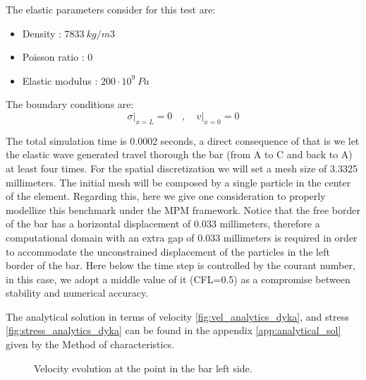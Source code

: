 The elastic parameters consider for this test are:
\begin{itemize} 
\item  Density : $7833\ kg/m3$
\item  Poisson ratio : $0$
\item  Elastic modulus : $200 \cdot 10^9\ Pa$
\end{itemize}

The boundary conditions are:
\begin{equation}
  \label{eq:3}
  \sigma \rvert_{x=L} = 0 \quad , \quad v \rvert_{x=0} = 0
\end{equation}

The total simulation time is 0.0002 seconds, a direct consequence of
that is we let the elastic wave generated travel thorough the bar
(from A to C and back to A) at least four times. For the spatial
discretization we will set a mesh size of 3.3325 millimeters. The
initial mesh will be composed by a single particle in the center of
the element. Regarding this, here we give one consideration to
properly modellize this benchmark under the MPM framework. Notice that
the free border of the bar has a horizontal displacement of 0.033
millimeters, therefore a computational domain with an extra gap of
0.033 millimeters is required in order to accommodate the
unconstrained displacement of the particles in the left border of the
bar. Here below the time step is controlled by the courant number, in
this case, we adopt a middle value of it (CFL=0.5) as a compromise
between stability and numerical accuracy. 

The analytical solution in terms of velocity
\ref{fig:vel_analytics_dyka}, and stress
\ref{fig:stress_analytics_dyka} can be found in the appendix
\ref{app:analytical_sol} given by the Method of characteristics.

\begin{figure}\sidecaption
  \centering
  \caption{Velocity evolution at the point in the bar left side.}
  \label{fig:Dyka-PCE-FE}
\end{figure}


